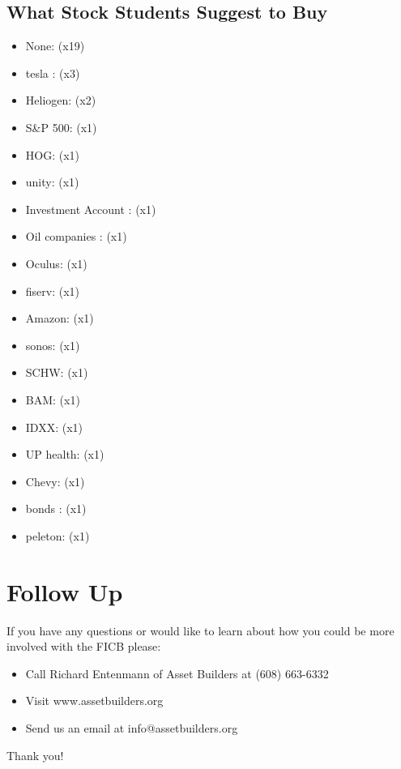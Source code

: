 \documentclass{article}%
\begin{document}
\noindent\makebox[\linewidth]{\rule{\paperwidth}{0.4pt}}%
\begin{multicols}{2}%
\section{What Stock Students Suggest to Buy}%
\label{sec:WhatStockStudentsSuggesttoBuy}%
\begin{itemize}%
\item%
None: (x19)%
\item%
tesla : (x3)%
\item%
Heliogen: (x2)%
\item%
S\&P 500: (x1)%
\item%
HOG: (x1)%
\item%
unity: (x1)%
\item%
Investment Account : (x1)%
\item%
Oil companies : (x1)%
\item%
Oculus: (x1)%
\item%
fiserv: (x1)%
\item%
Amazon: (x1)%
\item%
sonos: (x1)%
\item%
SCHW: (x1)%
\item%
BAM: (x1)%
\item%
IDXX: (x1)%
\item%
UP health: (x1)%
\item%
Chevy: (x1)%
\item%
bonds : (x1)%
\item%
peleton: (x1)%
\end{itemize}

%
\end{multicols}%
\pagebreak%
\section{Follow Up}%
\label{sec:FollowUp}%
If you have any questions or would like to learn about how you could be more involved with the FICB please:%
\begin{itemize}%
\item%
Call Richard Entenmann of Asset Builders at (608) 663{-}6332%
\item%
Visit www.assetbuilders.org%
\item%
Send us an email at info@assetbuilders.org%
\end{itemize}%
Thank you!

%
\end{document}
